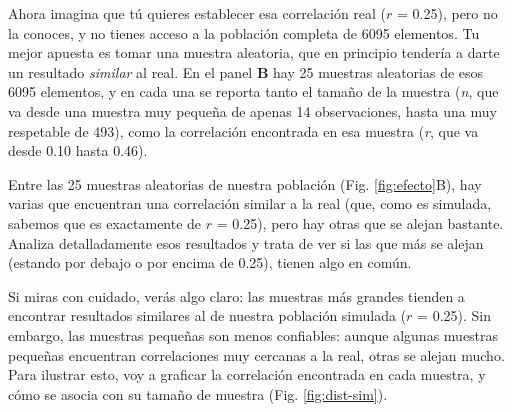 \documentclass[
  bookmarksnumbered]{article}
\begin{document}
Ahora imagina que tú quieres establecer esa correlación real (\(r\) = 0.25), pero no la conoces, y no tienes acceso a la población completa de 6095 elementos. Tu mejor apuesta es tomar una muestra aleatoria, que en principio tendería a darte un resultado \emph{similar} al real. En el panel \textbf{B} hay 25 muestras aleatorias de esos 6095 elementos, y en cada una se reporta tanto el tamaño de la muestra (\emph{n}, que va desde una muestra muy pequeña de apenas 14 observaciones, hasta una muy respetable de 493), como la correlación encontrada en esa muestra (\emph{r}, que va desde 0.10 hasta 0.46).

Entre las 25 muestras aleatorias de nuestra población (Fig. \ref{fig:efecto}B), hay varias que encuentran una correlación similar a la real (que, como es simulada, sabemos que es exactamente de \(r\) = 0.25), pero hay otras que se alejan bastante. Analiza detalladamente esos resultados y trata de ver si las que más se alejan (estando por debajo o por encima de 0.25), tienen algo en común.

Si miras con cuidado, verás algo claro: las muestras más grandes tienden a encontrar resultados similares al de nuestra población simulada (\(r\) = 0.25). Sin embargo, las muestras pequeñas son menos confiables: aunque algunas muestras pequeñas encuentran correlaciones muy cercanas a la real, otras se alejan mucho. Para ilustrar esto, voy a graficar la correlación encontrada en cada muestra, y cómo se asocia con su tamaño de muestra (Fig. \ref{fig:dist-sim}).
\end{document}
